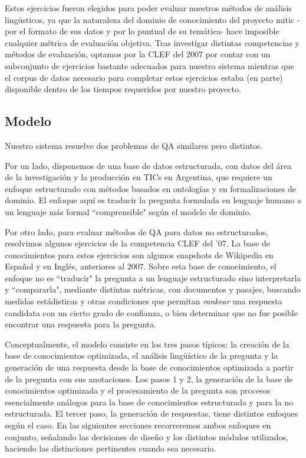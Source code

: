 Estos ejercicios fueron elegidos para poder evaluar nuestros métodos de análisis lingüsticos,
ya que la naturaleza del dominio de conocimiento del proyecto mitic - por el formato de sus datos
 y por lo puntual de su temática- hace imposible cualquier métrica de evaluación objetiva.
Tras investigar distintas competencias y métodos de evaluación, optamos por la CLEF del 2007
por contar con un subconjunto de ejercicios bastante adecuados para nuestro sistema mientras que el corpus
de datos necesario para completar estos ejercicios estaba (en parte) disponible dentro de los tiempos 
requeridos por nuestro proyecto. 

\bigskip

\subsection{Modelo}

Nuestro sistema resuelve dos problemas de QA similares pero distintos. 

Por un lado, disponemos de una base de datos estructurada, con datos del área de la investigación y la
producción en TICs en Argentina, que requiere un enfoque estructurado con métodos basados en ontologías y en 
formalizaciones de dominio. El enfoque aquí es traducir la pregunta formulada en lenguaje humano a un lenguaje más
formal ``comprensible" según el modelo de dominio. 

Por otro lado, para evaluar métodos de QA 
para datos no estructurados, resolvimos algunos ejercicios de la competencia CLEF del '07. La base de conocimientos para
estos ejercicios son algunos snapshots de Wikipedia en Espa\~nol y en Inglés, anteriores al 2007. Sobre esta base de conocimiento,
el enfoque no es ``traducir" la pregunta a un lenguaje estructurado sino interpretarla y ``compararla", mediante distintas métricas, 
con documentos y pasajes, buscando medidas estádisticas y otras condiciones que permitan \textit{rankear} una respuesta candidata
con un cierto grado de confianza, o bien determinar que no fue posible encontrar una respuesta para la pregunta. 


Conceptualmente, el modelo consiste en los tres pasos típicos: la
creación de la base de conocimientos optimizada, el análisis
lingüístico de la pregunta y la generación de una respuesta desde
la base de conocimientos optimizada a partir de la pregunta con sus
anotaciones. 
Los pasos 1 y 2, la generación de la base de conocimientos optimizada y el procesamiento de la pregunta son procesos
esencialmente análogos para la base de conocimientos estructurada y para la no estructurada. El tercer paso, la generación de respuestas,
tiene distintos enfoques según el caso. 
En las siguientes secciones recorreremos ambos enfoques en conjunto, señalando las decisiones de dise\~no y los distintos módulos
utilizados, haciendo las distinciones pertinentes cuando sea necesario.

